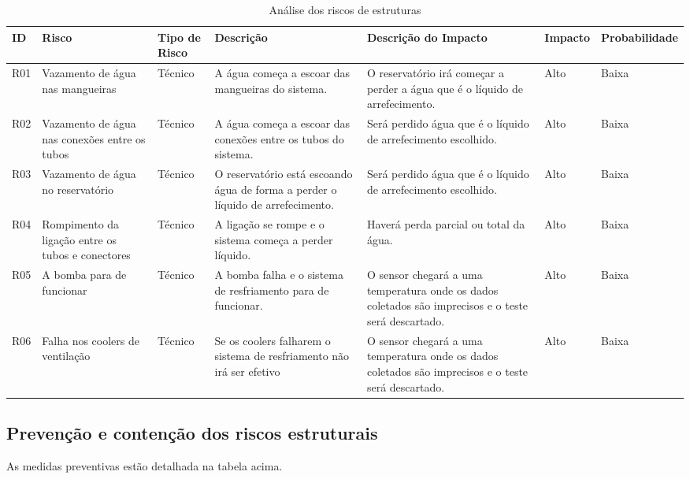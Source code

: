 \begin{table}
    \centering
    \begin{tabular}{|p{1cm}|p{2.2cm}|p{1.8cm}|p{3cm}|p{3cm}|p{1.7cm}|p{2cm}|}
    \hline
    \textbf{ID}  & \textbf{Risco} & \textbf{Tipo de Risco} & \textbf{Descrição} & \textbf{Descrição do Impacto} & \textbf{Impacto} & \textbf{Probabilidade} \\ \hline
    R01 & Vazamento de água nas mangueiras & Técnico & A água começa a escoar das mangueiras do sistema. & O reservatório irá começar a perder a água que é o líquido de arrefecimento. & Alto & Baixa \\ \hline
    R02 & Vazamento de água nas conexões entre os tubos & Técnico & A água começa a escoar das conexões entre os tubos do sistema. & Será perdido água que é o líquido de arrefecimento escolhido. & Alto & Baixa \\ \hline
    R03 & Vazamento de água no reservatório & Técnico & O reservatório está escoando água de forma a perder o líquido de arrefecimento. & Será perdido água que é o líquido de arrefecimento escolhido. & Alto & Baixa \\ \hline
    R04 & Rompimento da ligação entre os tubos e conectores & Técnico & A ligação se rompe e o sistema começa a perder líquido. &Haverá perda parcial ou total da água.  & Alto & Baixa \\ \hline
    R05 & A bomba para de funcionar & Técnico & A bomba falha e o sistema de resfriamento para de funcionar. &O sensor chegará a uma temperatura onde os dados coletados são imprecisos e o teste será descartado.  & Alto & Baixa \\ \hline
    R06 & Falha nos coolers de ventilação & Técnico & Se os coolers falharem o sistema de resfriamento não irá ser efetivo  & O sensor chegará a uma temperatura onde os dados coletados são imprecisos e o teste será descartado.  & Alto & Baixa \\ \hline    
\end{tabular}
    \caption{Análise dos riscos de estruturas}
    \end{table} 


\subsection{Prevenção e contenção dos riscos estruturais}

As medidas preventivas estão detalhada na tabela acima.

